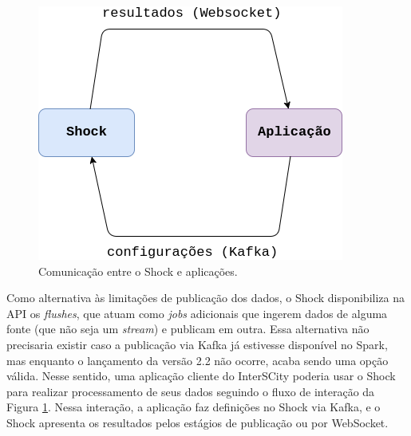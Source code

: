 \begin{figure}[hbt]
  \centering
    \includegraphics[scale=0.5]{figuras/ligacoes.png}
  \caption{Comunicação entre o Shock e aplicações.}
  \label{fig:ligacoes}
\end{figure}

Como alternativa às limitações de publicação dos dados, o Shock disponibiliza
na API os \textit{flushes}, que atuam como \textit{jobs} adicionais que ingerem
dados de alguma fonte (que não seja um \textit{stream}) e publicam em outra.
Essa alternativa não precisaria existir caso
a publicação via Kafka já estivesse disponível no Spark, mas enquanto o
lançamento da versão 2.2 não ocorre, acaba sendo uma opção válida.
Nesse sentido, uma aplicação cliente do InterSCity poderia usar o Shock para
realizar processamento de seus dados seguindo o fluxo de interação da Figura
\ref{fig:ligacoes}. Nessa interação, a aplicação faz definições no Shock via
Kafka, e o Shock apresenta os resultados pelos estágios de publicação ou por
WebSocket.
